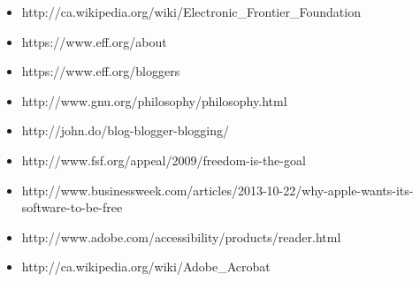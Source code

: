 \begin{itemize}
\item{http://ca.wikipedia.org/wiki/Electronic\_Frontier\_Foundation}
\item{https://www.eff.org/about}
\item{https://www.eff.org/bloggers}
\item{http://www.gnu.org/philosophy/philosophy.html}
\item{http://john.do/blog-blogger-blogging/}
\item{http://www.fsf.org/appeal/2009/freedom-is-the-goal}
\item{http://www.businessweek.com/articles/2013-10-22/why-apple-wants-its-software-to-be-free}
\item{http://www.adobe.com/accessibility/products/reader.html}
\item{http://ca.wikipedia.org/wiki/Adobe\_Acrobat}
\end{itemize}






